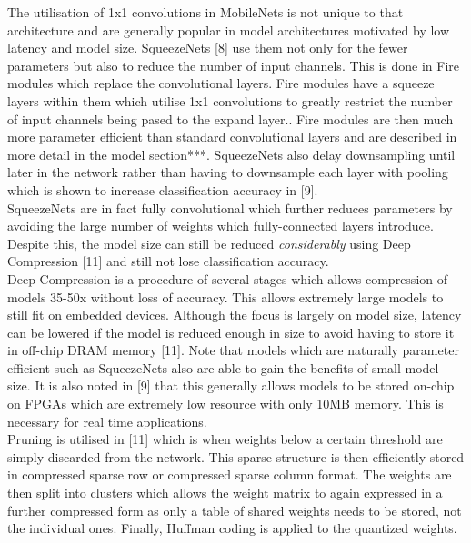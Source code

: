 \documentclass{article}
\begin{document}
The utilisation of 1x1 convolutions in MobileNets is not unique to that architecture and are generally popular in model architectures motivated by low latency and model size. SqueezeNets [8] use them not only for the fewer parameters but also to reduce the number of input channels. This is done in Fire modules which replace the convolutional layers. Fire modules have a squeeze layers within them which utilise 1x1 convolutions to greatly restrict the number of input channels being pased to the expand layer.. Fire modules are then much more parameter efficient than standard convolutional layers and are described in more detail in the model section***. SqueezeNets also delay downsampling until later in the network rather than having to downsample each layer with pooling which is shown to increase classification accuracy in [9].\\

SqueezeNets are in fact fully convolutional which further reduces parameters by avoiding the large number of weights which fully-connected layers introduce. Despite this, the model size can still be reduced \emph{considerably} using Deep Compression  [11] and still not lose classification accuracy.\\

Deep Compression is a procedure of several stages which allows compression of models 35-50x without loss of accuracy. This allows extremely large models to still fit on embedded devices. Although the focus is largely on model size, latency can be lowered if the model is reduced enough in size to avoid having to store it in off-chip DRAM memory [11]. Note that models which are naturally parameter efficient such as SqueezeNets also are able to gain the benefits of small model size. It is also noted in [9] that this generally allows models to be stored on-chip on FPGAs which are extremely low resource with only 10MB  memory. This is necessary for real time applications. \\

Pruning is utilised in [11] which is when weights below a certain threshold are simply discarded from the network. This sparse structure is then efficiently stored in compressed sparse row or compressed sparse column format. The weights are then split into clusters which allows the weight matrix to again expressed in a further compressed form as only a table of shared weights needs to be stored, not the individual ones. Finally, Huffman coding is applied to the quantized weights.\\
\end{document}
